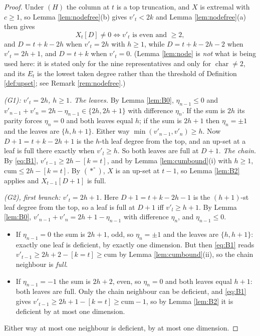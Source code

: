 \documentclass[reqno]{amsart}
\theoremstyle{plain}
\theoremstyle{definition}
\begin{document}
\begin{proof}
Under $(H)$ the column at $t$ is a top truncation, and $X$ is extremal with
$c\ge1$, so Lemma \ref{lem:nodefree}(b) gives $v'_t<2k$ and Lemma
\ref{lem:nodefree}(a) then gives
\[
   X_t[D]\ne0
   \iff v'_t \text{ is even and } \ge2 ,
\]
and $D=t+k-2h$ when $v'_t=2h$ with $h\ge1$, while $D=t+k-2h-2$ when
$v'_t=2h+1$, and $D=t+k$ when $v'_t=0$.  (Lemma \ref{lem:node} is \emph{not}
what is being used here: it is stated only for the nine representatives and
only for $\operatorname{char}\ne2$, and its $E_t$ is the lowest taken degree
rather than the threshold of Definition \ref{def:upset}; see Remark
\ref{rem:nodefree}.)

\smallskip\noindent\emph{(G1): $v'_t=2h$, $h\ge1$.}
\emph{The leaves.}  By Lemma \ref{lem:B0}, $\eta_{n-1}\le0$ and
$v'_{n-1}+v'_n=2h-\eta_{n-1}\in\{2h,2h+1\}$ with difference $\eta_n$.  If the
sum is $2h$ its parity forces $\eta_n=0$ and both leaves equal $h$; if the sum
is $2h+1$ then $\eta_n=\pm1$ and the leaves are $\{h,h+1\}$.  Either way
$\min(v'_{n-1},v'_n)\ge h$.  Now $D+1=t+k-2h+1$ is the $h$-th leaf degree from
the top, and an up-set at a leaf is full there exactly when $v'_l\ge h$.  So
both leaves are full at $D+1$.
\emph{The chain.}  By \eqref{eq:B1}, $v'_{t-1}\ge2h-[k=t]$, and by Lemma
\ref{lem:cumbound}(i) with $h\ge1$, $\mathrm{cum}\le 2h-[k=t]$.  By
$(*^\circ)$, $X$ is an up-set at $t-1$, so Lemma \ref{lem:B2} applies and
$X_{t-1}[D+1]$ is full.

\smallskip\noindent\emph{(G2), first branch: $v'_t=2h+1$.}
Here $D+1=t+k-2h-1$ is the $(h+1)$-st leaf degree from the top, so a leaf is
full at $D+1$ iff $v'_l\ge h+1$.  By Lemma \ref{lem:B0},
$v'_{n-1}+v'_n=2h+1-\eta_{n-1}$ with difference $\eta_n$, and $\eta_{n-1}\le0$.
\begin{itemize}\itemsep1pt
\item If $\eta_{n-1}=0$ the sum is $2h+1$, odd, so $\eta_n=\pm1$ and the leaves
are $\{h,h+1\}$: exactly one leaf is deficient, by exactly one dimension.  But
then \eqref{eq:B1} reads $v'_{t-1}\ge 2h+2-[k=t]\ge\mathrm{cum}$ by Lemma
\ref{lem:cumbound}(ii), so the chain neighbour is \emph{full}.
\item If $\eta_{n-1}=-1$ the sum is $2h+2$, even, so $\eta_n=0$ and both leaves
equal $h+1$: both leaves are full.  Only the chain neighbour can be deficient,
and \eqref{eq:B1} gives $v'_{t-1}\ge 2h+1-[k=t]\ge\mathrm{cum}-1$, so by Lemma
\ref{lem:B2} it is deficient by at most one dimension.
\end{itemize}
Either way at most one neighbour is deficient, by at most one dimension.


\end{proof}
\end{document}
